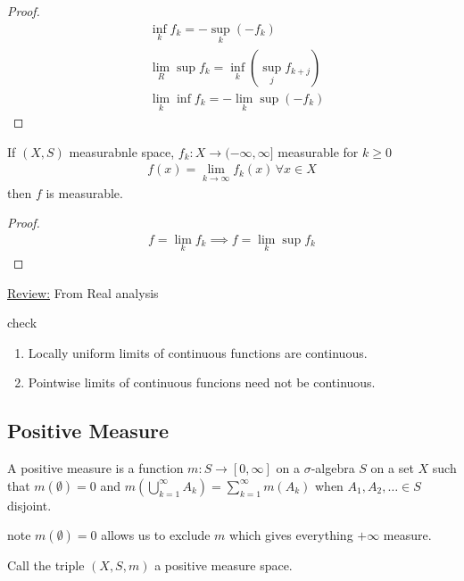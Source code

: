 \begin{proof}
	\begin{align*}
		&\inf_k f_k = - \sup_{k} (-f_k) \\
		&\lim_{R} \sup f_k = \inf_{k} (\sup_{j} f_{k+j}) \\
		&\lim_{k}\inf f_k = - \lim_{k} \sup (-f_k)
	\end{align*} 
\end{proof}

\begin{corollary}
	If $(X,S)$ measurabnle space, $f_k : X \to (-\infty, \infty]$ measurable for  $k \geq 0$ 
	 \begin{align*}
	    f (x) = \lim_{k \to  \infty} f_k (x) \, \forall x \in X
	\end{align*} then $f$ is measurable.
\end{corollary}

\begin{proof}
	 \begin{align*}
	f = \lim_{k} f_k \implies f = \lim_{k} \sup f_k
	\end{align*} 
\end{proof}

\underline{Review:} From Real analysis

check
\begin{enumerate}
	\item Locally uniform limits of continuous functions are continuous.
	\item Pointwise limits of continuous funcions need not be continuous.
\end{enumerate}

\subsection{Positive Measure}

\begin{definition}
	A positive measure is a function $m : S \to [0, \infty]$ on a $\sigma$-algebra $S$ on a set $X$ such that $m(\emptyset) = 0$
	and $m( \bigcup_{k=1}^{\infty} A_k) = \sum_{k=1}^{\infty} m(A_k)$ when 
	$A_1, A_2, \ldots \in S$ disjoint.

	{\tiny note $m(\emptyset) = 0$ allows us to exclude $m$ which gives everything $+\infty$ measure.}

	Call the triple $(X,S,m)$ a positive measure space.
\end{definition}

